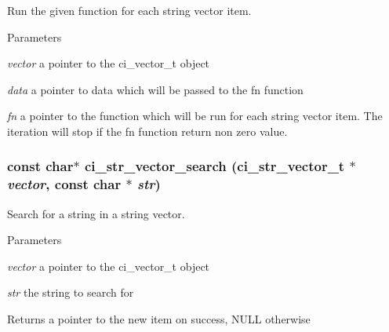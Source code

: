 Run the given function for each string vector item. 
\begin{DoxyParams}{Parameters}
\item[{\em vector}]a pointer to the ci\_\-vector\_\-t object \item[{\em data}]a pointer to data which will be passed to the fn function \item[{\em fn}]a pointer to the function which will be run for each string vector item. The iteration will stop if the fn function return non zero value. \end{DoxyParams}
\hypertarget{group__STR__VECTORS_ga16b28bbe7a99831a6a86dafe7fb98b07}{
\subsubsection[{ci\_\-str\_\-vector\_\-search}]{\setlength{\rightskip}{0pt plus 5cm}const char$\ast$ ci\_\-str\_\-vector\_\-search ({\bf ci\_\-str\_\-vector\_\-t} $\ast$ {\em vector}, \/  const char $\ast$ {\em str})}}
\label{group__STR__VECTORS_ga16b28bbe7a99831a6a86dafe7fb98b07}


Search for a string in a string vector. 
\begin{DoxyParams}{Parameters}
\item[{\em vector}]a pointer to the ci\_\-vector\_\-t object \item[{\em str}]the string to search for \end{DoxyParams}
\begin{DoxyReturn}{Returns}
a pointer to the new item on success, NULL otherwise 
\end{DoxyReturn}
